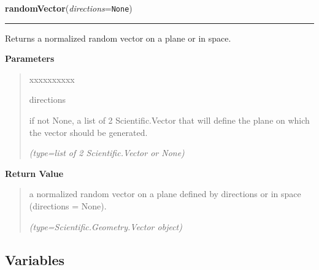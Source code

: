     \vspace{0.5ex}

\hspace{.8\funcindent}\begin{boxedminipage}{\funcwidth}

    \raggedright \textbf{randomVector}(\textit{directions}={\tt None})

    \vspace{-1.5ex}

    \rule{\textwidth}{0.5\fboxrule}
\setlength{\parskip}{2ex}
    Returns a normalized random vector on a plane or in space.

\setlength{\parskip}{1ex}
      \textbf{Parameters}
      \vspace{-1ex}

      \begin{quote}
        \begin{Ventry}{xxxxxxxxxx}

          \item[directions]

          if not None, a list of 2 Scientific.Vector that will define the 
          plane on which the vector should be generated.

            {\it (type=list of 2 Scientific.Vector or None)}

        \end{Ventry}

      \end{quote}

      \textbf{Return Value}
    \vspace{-1ex}

      \begin{quote}
      a normalized random vector on a plane defined by 
      {\textbar}directions{\textbar} or in space 
      ({\textbar}directions{\textbar} = None).

      {\it (type=Scientific.Geometry.Vector object)}

      \end{quote}

    \end{boxedminipage}



  \subsection{Variables}

